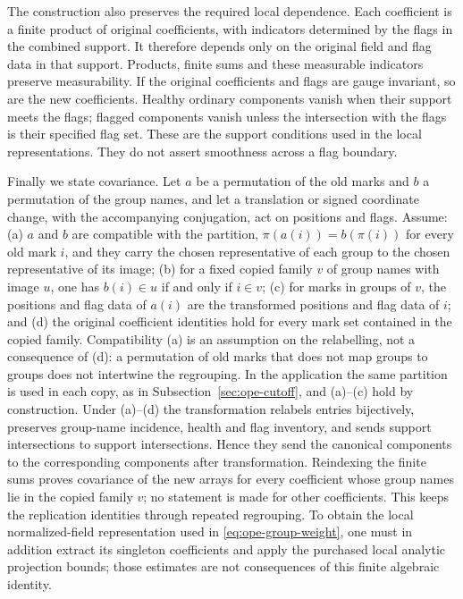 The construction also preserves the required local dependence.
Each coefficient is a finite product of original coefficients, with
indicators determined by the flags in the combined support. It
therefore depends only on the original field and flag data in that
support. Products, finite sums and these measurable indicators preserve
measurability. If the original coefficients and flags are gauge
invariant, so are the new coefficients. Healthy ordinary components
vanish when their support meets the flags; flagged components vanish
unless the intersection with the flags is their specified flag set.
These are the support conditions used in the local representations.
They do not assert smoothness across a flag boundary.

Finally we state covariance. Let $a$ be a permutation of the old marks
and $b$ a permutation of the group names, and let a translation or signed
coordinate change, with the accompanying conjugation, act on positions
and flags. Assume: (a) $a$ and $b$ are compatible with the partition,
$\pi(a(i))=b(\pi(i))$ for every old mark $i$, and they carry the chosen
representative of each group to the chosen representative of its image;
(b) for a fixed copied family $v$ of group names with image $u$, one has
$b(i)\in u$ if and only if $i\in v$; (c) for marks in groups of $v$, the
positions and flag data of $a(i)$ are the transformed positions and flag
data of $i$; and (d) the original coefficient identities hold for every
mark set contained in the copied family. Compatibility (a) is an
assumption on the relabelling, not a consequence of (d): a permutation of
old marks that does not map groups to groups does not intertwine the
regrouping. In the application the same partition is used in each copy,
as in Subsection~\ref{sec:ope-cutoff}, and (a)--(c) hold by construction.
Under (a)--(d) the transformation relabels entries bijectively, preserves
group-name incidence, health and flag inventory, and sends support
intersections to support intersections. Hence they send the canonical
components to the corresponding components after transformation.
Reindexing the finite sums proves covariance of the new arrays for
every coefficient whose group names lie in the copied family $v$; no
statement is made for other coefficients. This keeps the replication identities through repeated
regrouping. To obtain the local normalized-field representation used
in \eqref{eq:ope-group-weight}, one must in addition extract its
singleton coefficients and apply the purchased local analytic
projection bounds; those estimates are not consequences of this
finite algebraic identity.

